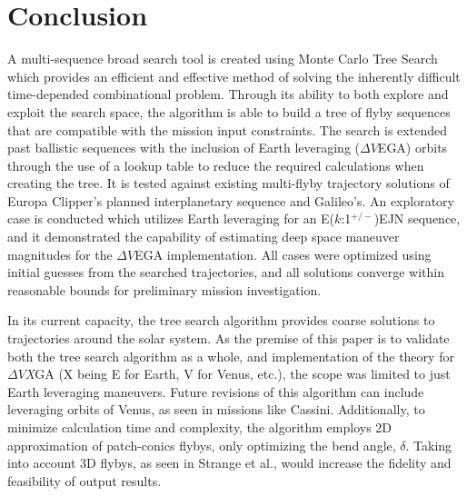 \documentclass[letterpaper, preprint, paper,11pt]{AAS}	%
\begin{document}
\section*{Conclusion}

A multi-sequence broad search tool is created using Monte Carlo Tree Search which provides an efficient and effective method of solving the inherently difficult time-depended combinational problem. Through its ability to both explore and exploit the search space, the algorithm is able to build a tree of flyby sequences that are compatible with the mission input constraints. The search is extended past ballistic sequences with the inclusion of Earth leveraging ($\Delta V$EGA) orbits through the use of a lookup table to reduce the required calculations when creating the tree. It is tested against existing multi-flyby trajectory solutions of Europa Clipper's planned interplanetary sequence and Galileo's. An exploratory case is conducted which utilizes Earth leveraging for an E($k$:1$^{+/-}$)EJN sequence, and it demonstrated the capability of estimating deep space maneuver magnitudes for the $\Delta V$EGA implementation. All cases were optimized using initial guesses from the searched trajectories, and all solutions converge within reasonable bounds for preliminary mission investigation.

In its current capacity, the tree search algorithm provides coarse solutions to trajectories around the solar system. As the premise of this paper is to validate both the tree search algorithm as a whole, and implementation of the theory for $\Delta V$\textit{X}GA (X being E for Earth, V for Venus, etc.), the scope was limited to just Earth leveraging maneuvers. Future revisions of this algorithm can include leveraging orbits of Venus, as seen in missions like Cassini. Additionally, to minimize calculation time and complexity, the algorithm employs 2D approximation of patch-conics flybys, only optimizing the bend angle, $\delta$. Taking into account 3D flybys, as seen in Strange et al.\cite{Strange2008}, would increase the fidelity and feasibility of output results.

\end{document}
